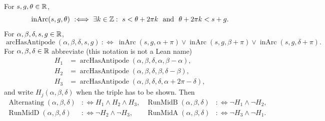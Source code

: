 \begin{definition}\label{pc:def:arc}
For $s,g,\theta\in\mathbb R$,
\[
  \operatorname{inArc}(s,g,\theta)\ :\Longleftrightarrow\ \exists k\in\Z:\ s<\theta+2\pi k\ \text{ and }\ \theta+2\pi k<s+g .
\]
For $\alpha,\beta,\delta,s,g\in\mathbb R$,
\[
  \operatorname{arcHasAntipode}(\alpha,\beta,\delta,s,g)\ :\Longleftrightarrow\
  \operatorname{inArc}(s,g,\alpha+\pi)\vee\operatorname{inArc}(s,g,\beta+\pi)\vee\operatorname{inArc}(s,g,\delta+\pi).
\]
For $\alpha,\beta,\delta\in\mathbb R$ abbreviate (this notation is not a Lean name)
\begin{align*}
  H_1&=\operatorname{arcHasAntipode}(\alpha,\beta,\delta,\alpha,\beta-\alpha),\\
  H_2&=\operatorname{arcHasAntipode}(\alpha,\beta,\delta,\beta,\delta-\beta),\\
  H_3&=\operatorname{arcHasAntipode}(\alpha,\beta,\delta,\delta,\alpha+2\pi-\delta),
\end{align*}
and write $H_j(\alpha,\beta,\delta)$ when the triple has to be shown. Then
\begin{align*}
  \operatorname{Alternating}(\alpha,\beta,\delta)&:\Longleftrightarrow H_1\wedge H_2\wedge H_3,&
  \operatorname{RunMidB}(\alpha,\beta,\delta)&:\Longleftrightarrow \neg H_1\wedge\neg H_2,\\
  \operatorname{RunMidD}(\alpha,\beta,\delta)&:\Longleftrightarrow \neg H_2\wedge\neg H_3,&
  \operatorname{RunMidA}(\alpha,\beta,\delta)&:\Longleftrightarrow \neg H_3\wedge\neg H_1 .
\end{align*}
\end{definition}

